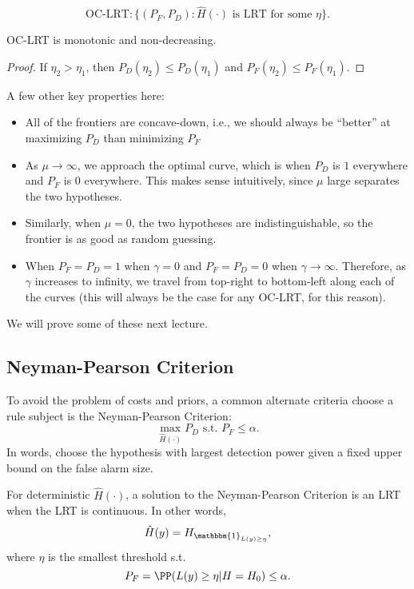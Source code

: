 \[\text{OC-LRT}: \{(P_F, P_D): \hat{H}(\cdot)\text{ is LRT for some }\eta\}.\] 

\begin{theorem}
\claimlabel

OC-LRT is monotonic and non-decreasing. 
\end{theorem}

\begin{proof}
If $\eta_2 > \eta_1$, then $P_D(\eta_2)\leq P_D(\eta_1)$ and $P_F(\eta_2)\leq P_F(\eta_1)$.
\end{proof}
\noindent A few other key properties here: 
\begin{itemize}
	\item All of the frontiers are concave-down, i.e., we should always be ``better'' at maximizing $P_D$ than minimizing $P_F$
	\item As $\mu\rightarrow \infty$, we approach the optimal curve, which is when $P_D$ is $1$ everywhere and $P_F$ is $0$ everywhere. This makes sense intuitively, since $\mu$ large separates the two hypotheses. 
	\item Similarly, when $\mu = 0$, the two hypotheses are indistinguishable, so the frontier is as good as random guessing. 
	\item When $P_F = P_D = 1$ when $\gamma = 0$ and $P_F = P_D = 0$ when $\gamma\rightarrow \infty$. Therefore, as $\gamma$ increases to infinity, we travel from top-right to bottom-left along each of the curves (this will always be the case for any OC-LRT, for this reason). 
\end{itemize}
We will prove some of these next lecture.

\subsection{Neyman-Pearson Criterion}

To avoid the problem of costs and priors, a common alternate criteria choose a rule subject is the \ac{Neyman-Pearson Criterion}: 
\[\max_{\hat{H}(\cdot)}P_D \text{ s.t. }P_F\leq \alpha.\] 
In words, choose the hypothesis with largest detection power given a fixed upper bound on the false alarm size.
\begin{theorem}

For deterministic $\hat{H}(\cdot)$, a solution to the Neyman-Pearson Criterion is an LRT when the LRT is continuous. In other words, 
\[\hat{H}(y) = H_{\mathbbm{1}_{L(y)\geq \eta}},\] 
where $\eta$ is the smallest threshold s.t. 
\[P_F = \PP(L(y)\geq \eta | H=H_0)\leq \alpha.\] 
\end{theorem}

